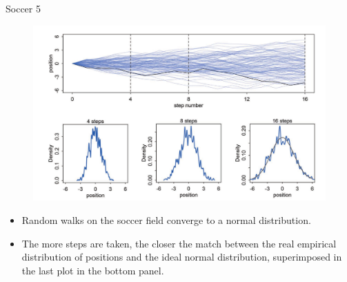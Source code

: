 \documentclass[handout]{beamer}
\begin{document}
\begin{frame}{Soccer 5}
 \begin{figure}[h!]
	\centering
	\includegraphics[scale=0.25]{pics/soccer5.png}
\end{figure}

\begin{scriptsize}
\begin{itemize}
 \item  Random walks on the soccer field converge to a normal distribution. 
 \item The more steps are taken, the closer the match between the real empirical distribution of positions and the ideal normal distribution, superimposed in the last plot in the bottom panel.
\end{itemize}
\end{scriptsize}

\end{frame}
\end{document}
